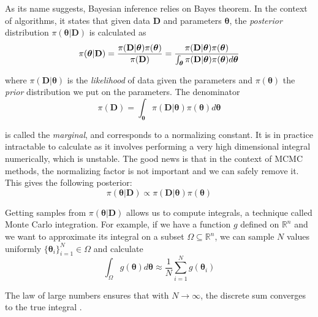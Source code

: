 \documentclass[12pt]{memoir}
\newcommand{\mb}{\mathbf}
\newcommand{\tb}{\textbf}
\newcommand{\ti}{\textit}
\newcommand{\btheta}{\boldsymbol{\theta}}
\begin{document}
As its name suggests, Bayesian inference relies on Bayes theorem. In the context of algorithms, it states that given data $\mb{D}$ and parameters $\boldsymbol{\theta}$, the \textit{posterior} distribution $\pi(\btheta|\mb{D})$ is calculated as
\begin{equation} \label{eq:posterior-with-marginal}
    \pi(\boldsymbol{\theta}|\mb{D}) = \frac{\pi(\mb{D}|\boldsymbol{\theta})\pi(\boldsymbol{\theta})}{\pi(\tb D)} = \frac{\pi(\mb{D}|\boldsymbol{\theta})\pi(\boldsymbol{\theta})}{\int_{\boldsymbol{\theta}} \pi(\mb{D}|\boldsymbol{\theta}) \pi(\boldsymbol{\theta})d\boldsymbol{\theta}}
\end{equation}

where $\pi(\mb{D}|\btheta)$ is the \ti{likelihood} of data given the parameters and $\pi(\btheta)$ the \ti{prior} distribution we put on the parameters. The denominator
\begin{equation}
    \pi(\mb{D}) = {\int_{\boldsymbol{\theta}} \pi(\mb{D}|\boldsymbol{\theta}) \pi(\boldsymbol{\theta})d\boldsymbol{\theta}}
\end{equation}

is called the \ti{marginal}, and corresponds to a normalizing constant. It is in practice intractable to calculate as it involves performing a very high dimensional integral numerically, which is unstable. The good news is that in the context of MCMC methods, the normalizing factor is not important and we can safely remove it. This gives the following posterior:
\begin{equation} \label{eq:posterior-without-marginal}
    \pi(\boldsymbol{\theta}|\mb{D}) \propto {\pi(\mb{D}|\boldsymbol{\theta}) \pi(\boldsymbol{\theta})}
\end{equation}

Getting samples from $\pi(\boldsymbol{\theta}|\mb{D})$ allows us to compute integrals, a technique called Monte Carlo integration. For example, if we have a function $g$ defined on $\mathbb{R}^n$ and we want to approximate its integral on a subset $\Omega \subseteq \mathbb R^n$, we can sample $N$ values uniformly $\{\btheta_i\}_{i=1}^N \in \Omega$ and calculate
\begin{equation}
    \int_\Omega g(\btheta) d\btheta \approx \frac{1}{N} \sum_{i=1}^{N} g(\btheta_i)
\end{equation}

The law of large numbers ensures that with $N \rightarrow \infty$, the discrete sum converges to the true integral \cite{wiki:monte-carlo-integration}.\medbreak
\end{document}
